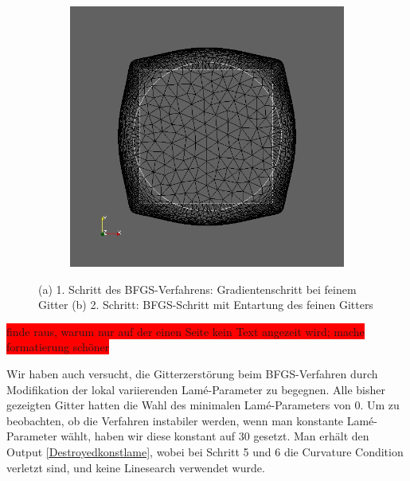 \begin{figure}
\begin{subfigure}{0.5\textwidth}
	\includegraphics[scale=0.25]{pic_smallcircle_bfgsdestroyed2.jpg}
	\caption{}	
	\end{subfigure}
\caption{(a) 1. Schritt des BFGS-Verfahrens: Gradientenschritt bei feinem Gitter (b) 2. Schritt: BFGS-Schritt mit Entartung des feinen Gitters}
\label{Destroyedbfgs}
\end{figure}

\colorbox{red}{finde raus, warum nur auf der einen Seite kein Text angezeit wird; mache formatierung schöner}

Wir haben auch versucht, die Gitterzerstörung beim BFGS-Verfahren durch Modifikation der lokal variierenden Lamé-Parameter zu begegnen. Alle bisher gezeigten Gitter hatten die Wahl des minimalen Lamé-Parameters von 0. Um zu beobachten, ob die Verfahren instabiler werden, wenn man konstante Lamé-Parameter wählt, haben wir diese konstant auf 30 gesetzt. Man erhält den Output \ref{Destroyedkonstlame}, wobei bei Schritt 5 und 6 die Curvature Condition verletzt sind, und keine Linesearch verwendet wurde.

